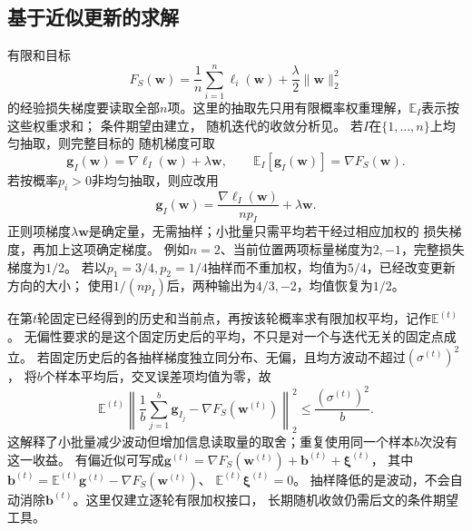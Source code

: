\subsection{基于近似更新的求解}
\label{sec:opt-stochastic-gradient-stability}

有限和目标
\[
  F_S(\bm{w})=\frac1n\sum_{i=1}^n\ell_i(\bm{w})
  +\frac{\lambda}{2}\lVert\bm{w}\rVert_2^2
\]
的经验损失梯度要读取全部$n$项。这里的抽取先只用有限概率权重理解，$\mathbb E_I$表示按这些权重求和；
条件期望由建立，
随机迭代的收敛分析见。
若$I$在$\{1,\ldots,n\}$上均匀抽取，则完整目标的
随机梯度可取
\[
  \bm{g}_I(\bm{w})
  =\nabla\ell_I(\bm{w})+\lambda\bm{w},\qquad
  \mathbb{E}_I[\bm{g}_I(\bm{w})]
  =\nabla F_S(\bm{w}).
\]
若按概率$p_i>0$非均匀抽取，则应改用
\[
  \bm{g}_I(\bm{w})
  =\frac{\nabla\ell_I(\bm{w})}{np_I}+\lambda\bm{w}.
\]
正则项梯度$\lambda\bm{w}$是确定量，无需抽样；小批量只需平均若干经过相应加权的
损失梯度，再加上这项确定梯度。
例如$n=2$、当前位置两项标量梯度为$2,-1$，完整损失梯度为$1/2$。
若以$p_1=3/4,p_2=1/4$抽样而不重加权，均值为$5/4$，已经改变更新方向的大小；
使用$1/(np_I)$后，两种输出为$4/3,-2$，均值恢复为$1/2$。

在第$t$轮固定已经得到的历史和当前点，再按该轮概率求有限加权平均，记作$\mathbb E^{(t)}$。
无偏性要求的是这个固定历史后的平均，不只是对一个与迭代无关的固定点成立。
若固定历史后的各抽样梯度独立同分布、无偏，且均方波动不超过$(\sigma^{(t)})^2$，
将$b$个样本平均后，交叉误差项均值为零，故
\[
 \mathbb E^{(t)}\left\|\frac1b\sum_{j=1}^b\bm g_{I_j}
             -\nabla F_S(\bm w^{(t)})\right\|_2^2
 \leq\frac{(\sigma^{(t)})^2}{b}.
\]
这解释了小批量减少波动但增加信息读取量的取舍；重复使用同一个样本$b$次没有这一收益。
有偏近似可写成$\bm g^{(t)}=\nabla F_S(\bm w^{(t)})+\bm b^{(t)}+\bm\xi^{(t)}$，
其中$\bm b^{(t)}=\mathbb E^{(t)}\bm g^{(t)}-\nabla F_S(\bm w^{(t)})$、
$\mathbb E^{(t)}\bm\xi^{(t)}=0$。
抽样降低的是波动，不会自动消除$\bm b^{(t)}$。这里仅建立逐轮有限加权接口，
长期随机收敛仍需后文的条件期望工具。

